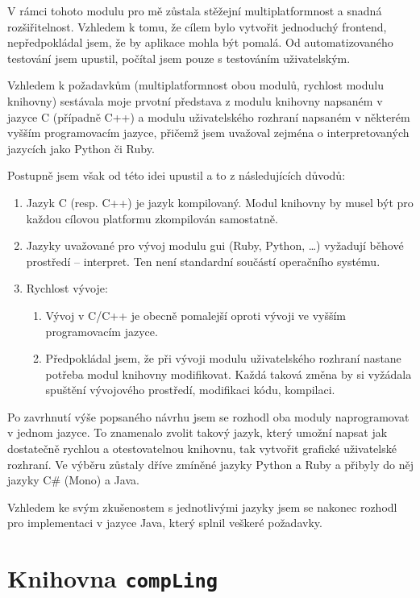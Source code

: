 \documentclass[dp.tex]{subfiles}
\begin{document}
V rámci tohoto modulu pro mě zůstala stěžejní multiplatformnost a snadná rozšiřitelnost. Vzhledem k tomu, že cílem bylo vytvořit jednoduchý frontend, nepředpokládal jsem, že by aplikace mohla být pomalá. Od automatizovaného testování jsem upustil, počítal jsem pouze s testováním uživatelským.

Vzhledem k požadavkům (multiplatformnost obou modulů, rychlost modulu knihovny) sestávala moje prvotní představa z modulu knihovny napsaném v jazyce C (případně C++) a modulu uživatelského rozhraní napsaném v některém vyšším programovacím jazyce, přičemž jsem uvažoval zejména o interpretovaných jazycích jako Python či Ruby. 

Postupně jsem však od této idei upustil a to z následujících důvodů:
\begin{enumerate}
\item Jazyk C (resp. C++) je jazyk kompilovaný. Modul knihovny by musel být pro každou cílovou platformu zkompilován samostatně.
\item Jazyky uvažované pro vývoj modulu \acrshort{gui} (Ruby, Python, \ldots) vyžadují běhové prostředí -- interpret. Ten není standardní součástí operačního systému.
\item Rychlost vývoje:
	\begin{enumerate}
	\item Vývoj v C/C++ je obecně pomalejší oproti vývoji ve vyšším programovacím jazyce. 
	\item Předpokládal jsem, že při vývoji modulu uživatelského rozhraní nastane potřeba modul knihovny modifikovat. Každá taková změna by si vyžádala spuštění vývojového prostředí, modifikaci kódu, kompilaci.
	\end{enumerate}
\end{enumerate}

Po zavrhnutí výše popsaného návrhu jsem se rozhodl oba moduly naprogramovat v jednom jazyce. To znamenalo zvolit takový jazyk, který umožní napsat jak dostatečně rychlou a otestovatelnou knihovnu, tak vytvořit grafické uživatelské rozhraní. Ve výběru zůstaly dříve zmíněné jazyky Python a Ruby a přibyly do něj jazyky C\# (Mono) a Java.

Vzhledem ke svým zkušenostem s jednotlivými jazyky jsem se nakonec rozhodl pro implementaci v jazyce Java, který splnil veškeré požadavky. 

\section{Knihovna \texttt{compLing}}
\end{document}
